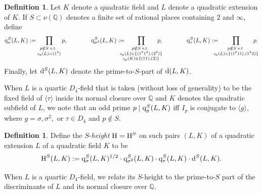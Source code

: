 \documentclass[10pt]{article}
\theoremstyle{plain}
\theoremstyle{definition}
\newtheorem{defn}[thm]{Definition}
\theoremstyle{remark}
\def\Val{{\nu}}
\def\H{{\rm H}}
\def\bQ{{\mathbb Q}}
\def\bQ{{\mathbb Q}}
\newcommand{\D}{{\rm d}}
\newcommand{\q}{{\rm q}}
\begin{document}
\begin{defn}\label{def:qs}
Let $K$ denote a quadratic field and $L$ denote a quadratic extension
of $K$. If $S \subset \Val(\bQ)$ denotes a finite set of rational
places containing $2$ and $\infty$, define
\begin{equation*}
\q^S_\sigma(L,K) := \prod_{\substack{ p \notin S \text{ s.t. } \\ \varsigma_p(L)=(1^4)}}
p, \qquad \qquad \q^S_{\sigma^2}(L,K) := \hspace{-10pt}
\prod_{\substack{ p \notin S \text{ s.t. } \\ \varsigma_p(L) \in \{(1^21^2),(2^2)\} \\ \varsigma_p(K) \in \{(11),(2)\}}} \hspace{-10pt}p,
\qquad \qquad \q^S_\tau(L,K) := \hspace{-10pt}\prod_{\substack{ p \notin S \text{ s.t } \\ \varsigma_p(L) \in \{(1^211),(1^22)\}}} \hspace{-10pt} p.
\end{equation*}
Finally, let $\D^S(L,K)$ denote the prime-to-$S$-part of $\D(L,K)$.
\end{defn}
When $L$ is a quartic $D_4$-field that is taken (without loss of generality) to be the fixed field of $\langle \tau \rangle$ inside its normal closure over $\bQ$ and $K$ denotes the quadratic subfield of $L$, we note that an odd prime $p \mid \q_{ g }^S(L,K)$ iff $I_p$ is conjugate to $\langle g \rangle$, where $g = \sigma, \sigma^2,$ or $\tau \in D_4$ and $p \notin S$.

\begin{defn}\label{sheight}
Define the $S$-{\it height} $\H=\H^S$ on such pairs $(L,K)$ of a quadratic
extension $L$ of a quadratic field $K$ to be
\begin{equation*}
\H^S(L,K):=\q_\sigma^{S}(L,K)^{1/2} \cdot \q^S_{\sigma^2}(L,K) \cdot \q^S_{\tau}(L,K) \cdot\D^{S}(L,K).
\end{equation*}
\end{defn}

When $L$ is a quartic $D_4$-field, we relate its $S$-height to the prime-to-$S$ part of the discriminants of $L$ and its normal closure over $\bQ$. 
\end{document}
